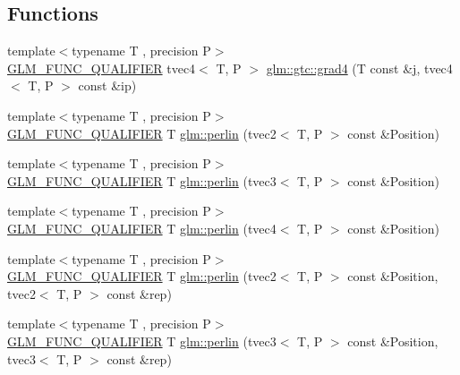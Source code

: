\subsection*{Functions}
\begin{DoxyCompactItemize}
\item 
{\footnotesize template$<$typename T , precision P$>$ }\\\mbox{\hyperlink{setup_8hpp_a33fdea6f91c5f834105f7415e2a64407}{G\+L\+M\+\_\+\+F\+U\+N\+C\+\_\+\+Q\+U\+A\+L\+I\+F\+I\+ER}} tvec4$<$ T, P $>$ \mbox{\hyperlink{namespaceglm_1_1gtc_a5c4a3d973c67fd78ab6bc8f993d172ac}{glm\+::gtc\+::grad4}} (T const \&\mbox{\hyperlink{glad_8h_a1fb4b4dc7b41b62604a44f280bccbd54}{j}}, tvec4$<$ T, P $>$ const \&ip)
\item 
{\footnotesize template$<$typename T , precision P$>$ }\\\mbox{\hyperlink{setup_8hpp_a33fdea6f91c5f834105f7415e2a64407}{G\+L\+M\+\_\+\+F\+U\+N\+C\+\_\+\+Q\+U\+A\+L\+I\+F\+I\+ER}} T \mbox{\hyperlink{namespaceglm_a911cdd6eb03df468ebd2b6f17ea43a3f}{glm\+::perlin}} (tvec2$<$ T, P $>$ const \&Position)
\item 
{\footnotesize template$<$typename T , precision P$>$ }\\\mbox{\hyperlink{setup_8hpp_a33fdea6f91c5f834105f7415e2a64407}{G\+L\+M\+\_\+\+F\+U\+N\+C\+\_\+\+Q\+U\+A\+L\+I\+F\+I\+ER}} T \mbox{\hyperlink{namespaceglm_a86c5aa2c23b2d0f62d3399ac024bc089}{glm\+::perlin}} (tvec3$<$ T, P $>$ const \&Position)
\item 
{\footnotesize template$<$typename T , precision P$>$ }\\\mbox{\hyperlink{setup_8hpp_a33fdea6f91c5f834105f7415e2a64407}{G\+L\+M\+\_\+\+F\+U\+N\+C\+\_\+\+Q\+U\+A\+L\+I\+F\+I\+ER}} T \mbox{\hyperlink{namespaceglm_accc072c37eff6ab426b7138d0bd1765f}{glm\+::perlin}} (tvec4$<$ T, P $>$ const \&Position)
\item 
{\footnotesize template$<$typename T , precision P$>$ }\\\mbox{\hyperlink{setup_8hpp_a33fdea6f91c5f834105f7415e2a64407}{G\+L\+M\+\_\+\+F\+U\+N\+C\+\_\+\+Q\+U\+A\+L\+I\+F\+I\+ER}} T \mbox{\hyperlink{namespaceglm_aa51d7040ecd2773574a520a4bd41f680}{glm\+::perlin}} (tvec2$<$ T, P $>$ const \&Position, tvec2$<$ T, P $>$ const \&rep)
\item 
{\footnotesize template$<$typename T , precision P$>$ }\\\mbox{\hyperlink{setup_8hpp_a33fdea6f91c5f834105f7415e2a64407}{G\+L\+M\+\_\+\+F\+U\+N\+C\+\_\+\+Q\+U\+A\+L\+I\+F\+I\+ER}} T \mbox{\hyperlink{namespaceglm_add9522a1426ca2f1499daf7603500269}{glm\+::perlin}} (tvec3$<$ T, P $>$ const \&Position, tvec3$<$ T, P $>$ const \&rep)

\end{DoxyCompactItemize}
